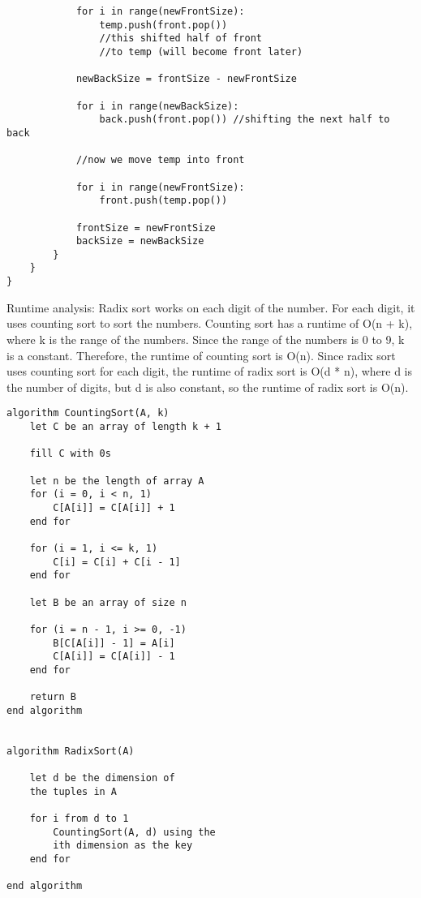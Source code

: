 \documentclass[11pt,largemargins]{homework}
\begin{document}
\begin{verbatim}
            for i in range(newFrontSize):
                temp.push(front.pop()) 
                //this shifted half of front
                //to temp (will become front later)
            
            newBackSize = frontSize - newFrontSize

            for i in range(newBackSize):
                back.push(front.pop()) //shifting the next half to back

            //now we move temp into front

            for i in range(newFrontSize):
                front.push(temp.pop())

            frontSize = newFrontSize
            backSize = newBackSize
        }
    }
}

\end{verbatim}





\newpage
\setcounter{questionCounter}{3}
\question


Runtime analysis:
Radix sort works on each digit of the number. For each digit, it uses counting sort to sort the numbers. Counting sort has a runtime of O(n + k), where k is the range of the numbers. Since the range of the numbers is 0 to 9, k is a constant. Therefore, the runtime of counting sort is O(n). Since radix sort uses counting sort for each digit, the runtime of radix sort is O(d * n), where d is the number of digits, but d is also constant, so the runtime of radix sort is O(n).

\begin{verbatim}
algorithm CountingSort(A, k)
    let C be an array of length k + 1

    fill C with 0s
    
    let n be the length of array A
    for (i = 0, i < n, 1)
        C[A[i]] = C[A[i]] + 1
    end for
    
    for (i = 1, i <= k, 1)
        C[i] = C[i] + C[i - 1]
    end for
    
    let B be an array of size n
    
    for (i = n - 1, i >= 0, -1)
        B[C[A[i]] - 1] = A[i]
        C[A[i]] = C[A[i]] - 1
    end for
    
    return B
end algorithm


algorithm RadixSort(A)

    let d be the dimension of
    the tuples in A

    for i from d to 1
        CountingSort(A, d) using the
        ith dimension as the key
    end for

end algorithm
\end{verbatim}
\end{document}
